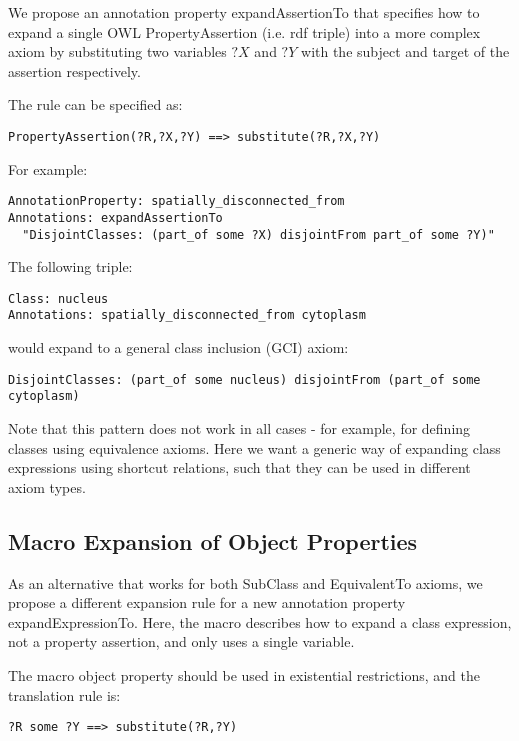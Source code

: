 \documentclass{llncs}
\begin{document}
We propose an annotation property expandAssertionTo that specifies how to expand
a single OWL PropertyAssertion (i.e. rdf triple) into a more complex
axiom by substituting two variables $?X$ and $?Y$ with the subject and
target of the assertion respectively.

The rule can be specified as:

\begin{verbatim}
PropertyAssertion(?R,?X,?Y) ==> substitute(?R,?X,?Y)
\end{verbatim}

For example:

\begin{verbatim}
AnnotationProperty: spatially_disconnected_from
Annotations: expandAssertionTo 
  "DisjointClasses: (part_of some ?X) disjointFrom part_of some ?Y)"
\end{verbatim}

The following triple:

\begin{verbatim}
Class: nucleus
Annotations: spatially_disconnected_from cytoplasm
\end{verbatim}

would expand to a general class inclusion (GCI) axiom:

\begin{verbatim}
DisjointClasses: (part_of some nucleus) disjointFrom (part_of some cytoplasm)
\end{verbatim}

Note that this pattern does not work in all cases - for example, for
defining classes using equivalence axioms. Here we want a generic way
of expanding class expressions using shortcut relations, such that
they can be used in different axiom types.

\subsection{Macro Expansion of Object Properties}

As an alternative that works for both SubClass and EquivalentTo
axioms, we propose a different expansion rule for a new annotation
property expandExpressionTo. Here, the macro describes how to expand a class
expression, not a property assertion, and only uses a single variable.

The macro object property should be used in existential restrictions,
and the translation rule is:

\begin{verbatim}
?R some ?Y ==> substitute(?R,?Y)
\end{verbatim}
\end{document}
